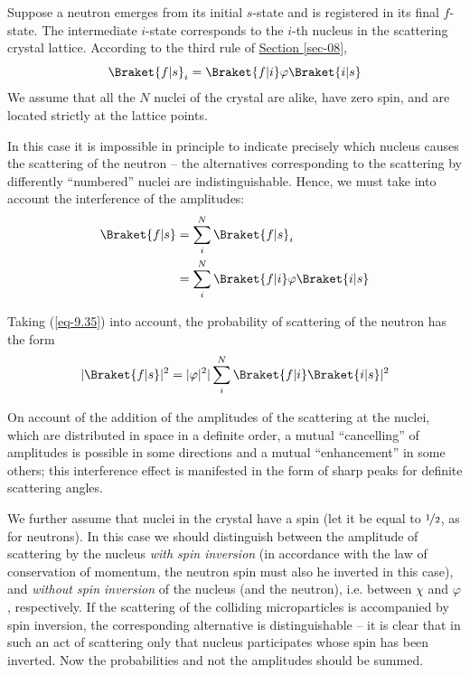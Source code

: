 \documentclass[a4paper,sfsidenotes,colorlinks=true]{tufte-book}
\numberwithin{equation}{section}
\numberwithin{figure}{section}
\begin{document}
Suppose a neutron emerges from its initial $s$-state and is registered
in its final $f$-state. The intermediate $i$-state corresponds to the $i$-th
nucleus in the scattering crystal lattice. According to the third rule
of \hyperref[sec-08]{Section \ref{sec-08}},
\begin{equation}%
\Braket{f|s}_{i} =\Braket{f|i} \varphi \Braket{i|s}
\label{eq-9.34}
 \end{equation}
 We assume that all the $N$ nuclei of the crystal are alike, have zero
 spin, and are located strictly at the lattice points.

 In this case it is impossible in principle to indicate precisely
 which nucleus causes the scattering of the neutron -- the alternatives
 corresponding to the scattering by differently ``numbered'' nuclei
 are indistinguishable. Hence, we must take into account the
 interference of the amplitudes:
\begin{equation}%
\begin{split}
\Braket{f|s} & = \sum_{i}^{N} \Braket{f|s}_{i}  \\
 & = \sum_{i}^{N} \Braket{f|i} \varphi \Braket{i|s}
\end{split}
\label{eq-9.35}
 \end{equation}

Taking (\ref{eq-9.35}) into account, the probability of scattering of the neutron has the form
\begin{equation}%
|\Braket{f|s} |^{2}= |\varphi |^{2} |\sum_{i}^{N} \Braket{f|i}
\Braket{i|s} |^{2}
\label{eq-9.36}
 \end{equation}

On account of the addition of the amplitudes of the scattering at the
nuclei, which are distributed in space in a definite order, a mutual
``cancelling'' of amplitudes is possible in some directions and a
mutual ``enhancement'' in some others; this interference effect is
manifested in the form of sharp peaks for definite scattering angles. 

We further assume that nuclei in the crystal have a spin (let it be
equal to $\nicefrac{1}{2}$, as for neutrons). In this case we should
distinguish between the amplitude of scattering by the nucleus
\emph{with spin inversion} (in accordance with the law of conservation
of momentum, the neutron spin must also he inverted in this case), and
\emph{without spin inversion} of the nucleus (and the neutron),
i.e. between $\chi$ and $\varphi$, respectively. If the scattering of
the colliding microparticles is accompanied by spin inversion, the
corresponding alternative is distinguishable -- it is clear that in such an act of scattering only that nucleus participates whose spin has been inverted. Now the probabilities and not the amplitudes should be summed.
\end{document}
